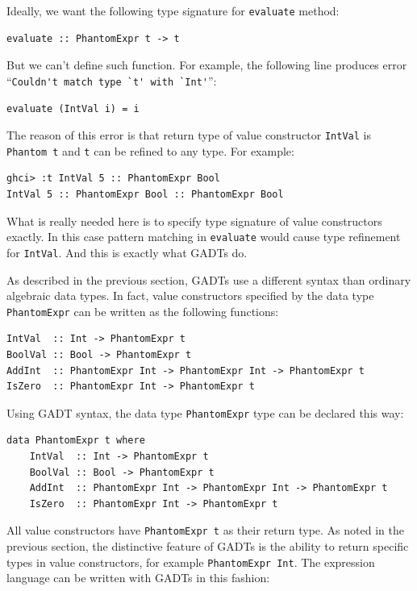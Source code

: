 \documentclass{tmr}
\begin{document}
Ideally, we want the following type signature for \verb|evaluate| method:

\begin{Verbatim}
evaluate :: PhantomExpr t -> t
\end{Verbatim}

But we can't define such function. For example, the following line produces error ``\verb|Couldn't match type `t' with `Int'|'':

\begin{Verbatim}
evaluate (IntVal i) = i
\end{Verbatim}

The reason of this error is that return type of value constructor \verb|IntVal| is \verb|Phantom t| and \verb|t| can be refined to any type. For example:

\begin{Verbatim}
ghci> :t IntVal 5 :: PhantomExpr Bool
IntVal 5 :: PhantomExpr Bool :: PhantomExpr Bool
\end{Verbatim}

What is really needed here is to specify type signature of value constructors exactly. In this case pattern matching in \verb|evaluate| would cause type refinement for \verb|IntVal|. And this is exactly what GADTs do.

As described in the previous section, GADTs use a different syntax than ordinary algebraic data types. In fact, value constructors specified by the data type \verb|PhantomExpr| can be written as the following functions:

\begin{Verbatim}
IntVal  :: Int -> PhantomExpr t
BoolVal :: Bool -> PhantomExpr t
AddInt  :: PhantomExpr Int -> PhantomExpr Int -> PhantomExpr t
IsZero  :: PhantomExpr Int -> PhantomExpr t
\end{Verbatim}

Using GADT syntax, the data type \verb|PhantomExpr| type can be declared this way:

\begin{Verbatim}
data PhantomExpr t where
    IntVal  :: Int -> PhantomExpr t
    BoolVal :: Bool -> PhantomExpr t
    AddInt  :: PhantomExpr Int -> PhantomExpr Int -> PhantomExpr t
    IsZero  :: PhantomExpr Int -> PhantomExpr t
\end{Verbatim}

All value constructors have \verb|PhantomExpr t| as their return type. As noted in the previous section, the distinctive feature of GADTs is the ability to return specific types in value constructors, for example \verb|PhantomExpr Int|. The expression language can be written with GADTs in this fashion:
\end{document}
